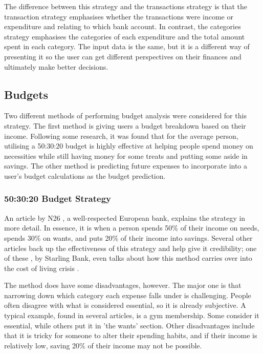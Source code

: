 The difference between this strategy and the transactions strategy is that the transaction strategy emphasises whether the transactions were income or expenditure and relating to which bank account. In contrast, the categories strategy emphasises the categories of each expenditure and the total amount spent in each category. The input data is the same, but it is a different way of presenting it so the user can get different perspectives on their finances and ultimately make better decisions.

\subsection{Budgets}
Two different methods of performing budget analysis were considered for this strategy. The first method is giving users a budget breakdown based on their income. Following some research, it was found that for the average person, utilising a 50:30:20 budget is highly effective at helping people spend money on necessities while still having money for some treats and putting some aside in savings. The other method is predicting future expenses to incorporate into a user's budget calculations as the budget prediction.

\subsubsection{50:30:20 Budget Strategy}

An article \cite{503020Strategy} by N26 , a well-respected European bank, explains the strategy in more detail. In essence, it is when a person spends 50\% of their income on needs, spends 30\% on wants, and puts 20\% of their income into savings. Several other articles back up the effectiveness of this strategy and help give it credibility; one of these \cite{503020InCostLivingCrisis}, by Starling Bank, even talks about how this method carries over into the cost of living crisis .

The method does have some disadvantages, however. The major one is that narrowing down which category each expense falls under is challenging. People often disagree with what is considered essential, so it is already subjective. A typical example, found in several articles, is a gym membership. Some consider it essential, while others put it in 'the wants' section. Other disadvantages include that it is tricky for someone to alter their spending habits, and if their income is relatively low, saving 20\% of their income may not be possible.

